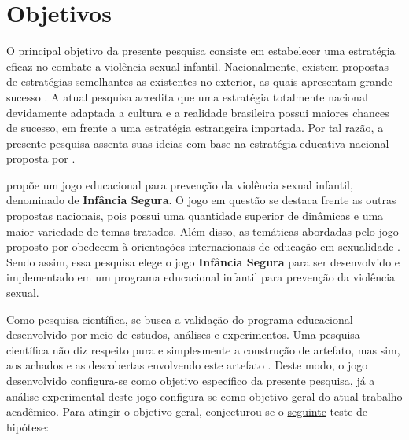 


\section{Objetivos}\label{sec:Objetivos}

O principal objetivo da presente pesquisa consiste em estabelecer uma estratégia eficaz no combate a violência sexual infantil. Nacionalmente, existem propostas de estratégias semelhantes as existentes no exterior, as quais apresentam grande sucesso \cite{steiler2012orbit, jones2020serious}. A atual pesquisa acredita que uma estratégia totalmente nacional devidamente adaptada a cultura e a realidade brasileira possui maiores chances de sucesso, em frente a uma estratégia estrangeira importada. Por tal razão, a presente pesquisa assenta suas ideias com base na estratégia educativa nacional proposta por .

 propõe um jogo educacional para prevenção da violência sexual infantil, denominado de \textbf{Infância Segura}. O jogo em questão se destaca frente as outras propostas nacionais, pois possui uma quantidade superior de dinâmicas e uma maior variedade de temas tratados. Além disso, as temáticas abordadas pelo jogo proposto por  obedecem à orientações internacionais de educação em sexualidade \cite{unesco2018international}. Sendo assim, essa pesquisa elege o jogo \textbf{Infância Segura} para ser desenvolvido e implementado em um programa educacional infantil para prevenção da violência sexual.

Como pesquisa científica, se busca a validação do programa educacional desenvolvido por meio de estudos, análises e experimentos. Uma pesquisa científica não diz respeito pura e simplesmente a construção de artefato, mas sim, aos achados e as descobertas envolvendo este artefato \cite{wazlawick2014metodologia}. Deste modo, o jogo desenvolvido configura-se como objetivo específico da presente pesquisa, já a análise experimental deste jogo configura-se como objetivo geral do atual trabalho acadêmico. Para atingir o objetivo geral, conjecturou-se o \hyperref[hipotese]{seguinte} teste de hipótese:

